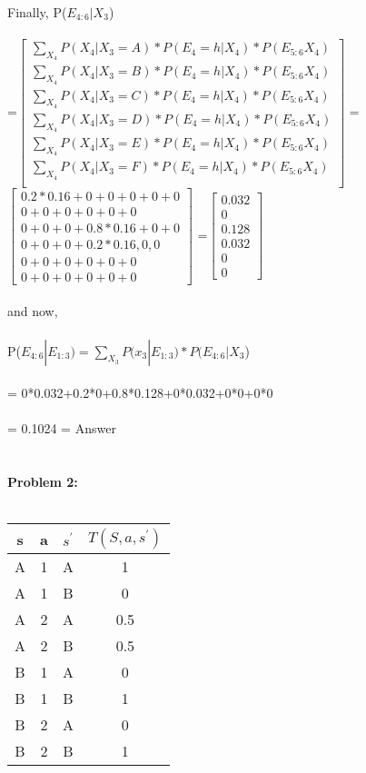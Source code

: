 \documentclass[11pt,a4paper]{article}
\begin{document}
Finally, P($E_{4:6}|X_{3}$)\\\\
=$\begin{bmatrix}
\sum_{X_{4}}P(X_{4}|X_{3}=A)*P(E_{4}=h|X_{4})*P(E_{5:6}X_{4})\\
\sum_{X_{4}}P(X_{4}|X_{3}=B)*P(E_{4}=h|X_{4})*P(E_{5:6}X_{4})\\
\sum_{X_{4}}P(X_{4}|X_{3}=C)*P(E_{4}=h|X_{4})*P(E_{5:6}X_{4})\\
\sum_{X_{4}}P(X_{4}|X_{3}=D)*P(E_{4}=h|X_{4})*P(E_{5:6}X_{4})\\
\sum_{X_{4}}P(X_{4}|X_{3}=E)*P(E_{4}=h|X_{4})*P(E_{5:6}X_{4})\\
\sum_{X_{4}}P(X_{4}|X_{3}=F)*P(E_{4}=h|X_{4})*P(E_{5:6}X_{4})\\
\end{bmatrix}$  =$\begin{bmatrix}
0.2*0.16+0+0+0+0+0\\
0+0+0+0+0+0\\
0+0+0+0.8*0.16+0+0\\
0+0+0+0.2*0.16,0,0\\
0+0+0+0+0+0\\
0+0+0+0+0+0
\end{bmatrix}$ =$\begin{bmatrix}
0.032\\0\\0.128\\0.032\\0\\0
\end{bmatrix}$ \\\\
and now,\\\\
P($E_{4:6}|E_{1:3})=\sum_{X_{3}}P(x_{3}|E_{1:3})*P(E_{4:6}|X_{3}$)\\\\
= 0*0.032+0.2*0+0.8*0.128+0*0.032+0*0+0*0\\\\
= 0.1024 = Answer\\\\\\
\newpage
 \textbf{ Problem 2: }\\\\
\begin{tabular}{|c|c|c|c|} 
\hline
s & a & $s^{'}$ & $T(S,a,s^{'})$ \\\hline
A & 1 & A & 1  \\
A & 1 & B & 0  \\
A & 2 & A & 0.5\\
A & 2 & B & 0.5\\ \hline
B & 1 & A & 0 \\
B & 1 & B & 1\\
B & 2 & A & 0 \\
B & 2 & B & 1\\ \hline
\end{tabular}
\end{document}
